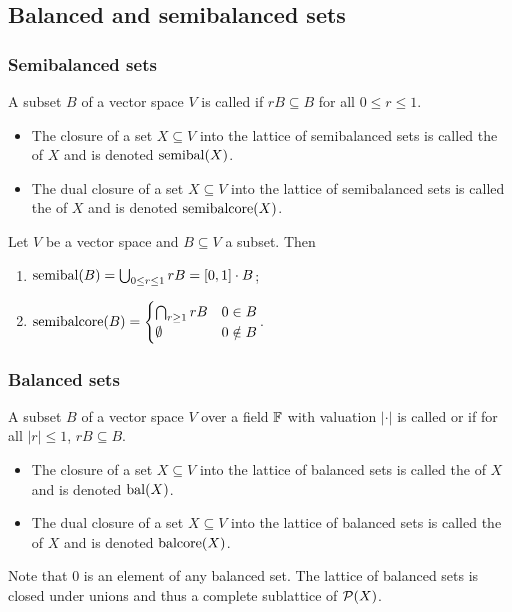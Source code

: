 \subsection{Balanced and semibalanced sets}
\subsubsection{Semibalanced sets}
\begin{definition}
A subset $B$ of a vector space $V$ is called  if $rB \subseteq B$ for all $0\leq r \leq 1$.

\begin{itemize}
\item The closure of a set $X\subseteq V$ into the lattice of semibalanced sets is called the  of $X$ and is denoted $\operatorname{semibal}(X)$.
\item The dual closure of a set $X\subseteq V$ into the lattice of semibalanced sets is called the  of $X$ and is denoted $\operatorname{semibalcore}(X)$.
\end{itemize}
\end{definition}

\begin{lemma}
Let $V$ be a vector space and $B\subseteq V$ a subset. Then
\begin{enumerate}
\item $\semibalanced(B) = \bigcup_{0\leq r\leq 1}rB = \interval{0,1}\cdot B$;
\item $\operatorname{semibalcore}(B) = \begin{cases}
\bigcap_{r\geq 1}rB & 0\in B\\
\emptyset & 0\notin B
\end{cases}$.
\end{enumerate}
\end{lemma}

\subsubsection{Balanced sets}
\begin{definition}
A subset $B$ of a vector space $V$ over a field $\mathbb{F}$ with valuation $|\cdot|$ is called  or  if for all $|r|\leq 1$, $rB \subseteq B$.

\begin{itemize}
\item The closure of a set $X\subseteq V$ into the lattice of balanced sets is called the  of $X$ and is denoted $\operatorname{bal}(X)$.
\item The dual closure of a set $X\subseteq V$ into the lattice of balanced sets is called the  of $X$ and is denoted $\operatorname{balcore}(X)$.
\end{itemize}
\end{definition}
Note that $0$ is an element of any balanced set. The lattice of balanced sets is closed under unions and thus a complete sublattice of $\operatorname{\mathcal{P}}(X)$.

